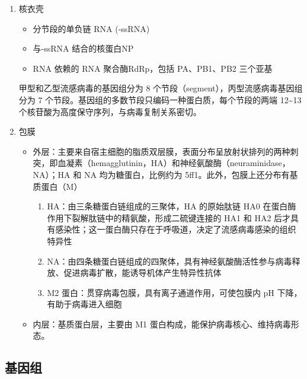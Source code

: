 \documentclass[9pt,a4paper,twoside]{rho-class/rho}
\begin{document}
    \begin{enumerate}
        \item 核衣壳
        \begin{itemize}
            \item 分节段的单负链 RNA (-ssRNA)
            \item 与-ssRNA 结合的核蛋白NP
            \item RNA 依赖的 RNA 聚合酶RdRp，包括 PA、PB1、PB2 三个亚基
        \end{itemize}
        甲型和乙型流感病毒的基因组分为 8 个节段（segment），丙型流感病毒基因组分为 7 个节段。基因组的多数节段只编码一种蛋白质，每个节段的两端 12\textasciitilde13 个核苷酸为高度保守序列，与病毒复制关系密切。
        \item 包膜
        \begin{itemize}
            \item 外层：主要来自宿主细胞的脂质双层膜，表面分布呈放射状排列的两种刺突，即血凝素（hemagglutinin，HA）和神经氨酸酶（neuraminidase，NA）；HA 和 NA 均为糖蛋白，比例约为 5ff1。此外，包膜上还分布有基质蛋白（M）
            \begin{enumerate}
                \item HA：由三条糖蛋白链组成的三聚体，HA 的原始肽链 HA0 在蛋白酶作用下裂解肽链中的精氨酸，形成二硫键连接的 HA1 和 HA2 后才具有感染性；这一蛋白酶只存在于呼吸道，决定了流感病毒感染的组织特异性
                \item NA：由四条糖蛋白链组成的四聚体，具有神经氨酸酶活性参与病毒释放、促进病毒扩散，能诱导机体产生特异性抗体
                \item M2 蛋白：贯穿病毒包膜，具有离子通道作用，可使包膜内 pH 下降，有助于病毒进入细胞
            \end{enumerate}
            \item 内层：基质蛋白层，主要由 M1 蛋白构成，能保护病毒核心、维持病毒形态。
        \end{itemize}
    \end{enumerate}

\subsection{基因组}
\end{document}
